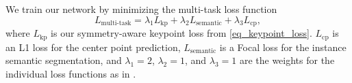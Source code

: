 We train our network by minimizing the multi-task loss function
\begin{equation}
 \label{eq_total_loss}
    L_\text{multi-task} = \lambda_1 L_\text{kp} 
    + \lambda_2 L_\text{semantic}  
    +  \lambda_3 L_\text{cp},
\end{equation}
where $L_\text{kp}$ is our symmetry-aware keypoint loss from \cref{eq_keypoint_loss}.
$L_\text{cp}$ is an L1 loss for the center point prediction, $L_\text{semantic}$ is a Focal loss \cite{focalLoss} for the instance semantic segmentation, and $\lambda_1=2$, $\lambda_2=1$, and $\lambda_3=1$ are the weights for the individual loss functions as in \cite{ffb6d}.

